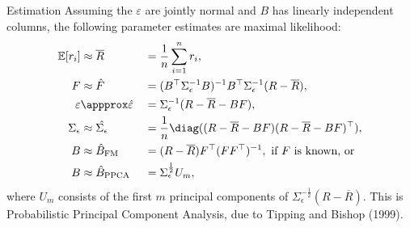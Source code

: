 \documentclass{beamer}
\begin{document}
\begin{frame}{Estimation}
	Assuming the $\varepsilon$ are jointly normal and $B$ has linearly independent columns, the following parameter estimates are maximal likelihood:
	\begin{align*}
		\mathbb{E}[r_i]		&\approx \overline{R}		&&= \frac{1}{n}\sum_{i=1}^n r_i,
	\\	F			&\approx \hat{F}		&&= (B^\top \Sigma_\epsilon^{-1} B)^{-1}B^\top \Sigma_\epsilon^{-1}(R-\overline{R}),
	\\	\varepsilon		&\appprox \hat{\varepsilon}	&&= \Sigma_\epsilon^{-1} (R-\overline{R}-BF),
	\\	\Sigma_\epsilon		&\approx \hat{\Sigma_\epsilon}	&&= \frac{1}{n}\diag((R-\overline{R}-BF)(R-\overline{R}-BF)^\top),
	\\	B			&\approx \hat{B}_\textrm{FM}	&&= (R-\overline{R})F^\top (FF^\top)^{-1},\textrm{ if }F\textrm{ is known, or}%
	\\	B			&\approx \hat{B}_\textrm{PPCA}	&&= \Sigma_\epsilon^\frac{1}{2} U_m,%
	\end{align*}
	where $U_m$ consists of the first $m$ principal components of $\Sigma_\epsilon^{-\frac{1}{2}}(R-\overline{R})$. This is Probabilistic Principal Component Analysis, due to Tipping and Bishop (1999).
\end{frame}
\end{document}
